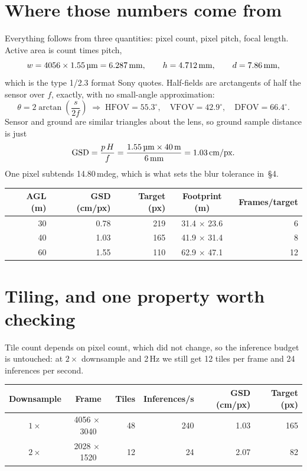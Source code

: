 \documentclass[11pt,a4paper]{article}
\begin{document}
\section{Where those numbers come from}

Everything follows from three quantities: pixel count, pixel pitch, focal
length. Active area is count times pitch,
\[
w = 4056 \times 1.55\,\text{\textmu m} = 6.287\,\text{mm},
\qquad
h = 4.712\,\text{mm},
\qquad
d = 7.86\,\text{mm},
\]
which is the type 1/2.3 format Sony quotes. Half-fields are arctangents of half
the sensor over $f$, exactly, with no small-angle approximation:
\[
\theta = 2\arctan\!\left(\frac{s}{2f}\right)
\;\Longrightarrow\;
\text{HFOV} = 55.3^\circ,\quad
\text{VFOV} = 42.9^\circ,\quad
\text{DFOV} = 66.4^\circ .
\]
Sensor and ground are similar triangles about the lens, so ground sample
distance is just
\[
\text{GSD} = \frac{p\,H}{f}
= \frac{1.55\,\text{\textmu m} \times 40\,\text{m}}{6\,\text{mm}}
= 1.03\,\text{cm/px} .
\]
One pixel subtends 14.80\,mdeg, which is what sets the blur
tolerance in~\S4.

\begin{center}
\begin{tabular}{r r r c r}
\toprule
\textbf{AGL} (m) & \textbf{GSD} (cm/px) & \textbf{Target} (px) &
\textbf{Footprint} (m) & \textbf{Frames/target} \\
\midrule
30 & 0.78 & 219 & 31.4$\,\times\,$23.6 & 6 \\
40 & 1.03 & 165 & 41.9$\,\times\,$31.4 & 8 \\
60 & 1.55 & 110 & 62.9$\,\times\,$47.1 & 12 \\
\bottomrule
\end{tabular}
\end{center}

\section{Tiling, and one property worth checking}

Tile count depends on pixel count, which did not change, so the inference
budget is untouched: at $2\times$ downsample and 2\,Hz we still get
12 tiles per frame and 24 inferences per second.

\begin{center}
\begin{tabular}{c c r r r r}
\toprule
\textbf{Downsample} & \textbf{Frame} & \textbf{Tiles} &
\textbf{Inferences/s} & \textbf{GSD} (cm/px) & \textbf{Target} (px) \\
\midrule
$1\times$ & 4056$\,\times\,$3040 & 48 & 240 & 1.03 & 165 \\
$2\times$ & 2028$\,\times\,$1520 & 12 & 24 & 2.07 & 82 \\
\bottomrule
\end{tabular}
\end{center}
\end{document}
